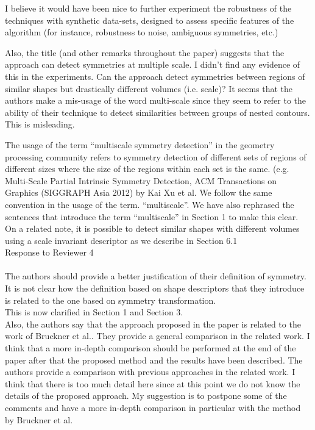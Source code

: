 \documentclass[10pt]{article}
\begin{document}
   I believe it would have been nice to further experiment the robustness of
   the techniques with synthetic data-sets, designed to assess specific
   features of the algorithm (for instance, robustness to noise, ambiguous
   symmetries, etc.)

   Also, the title (and other remarks throughout the paper) suggests that
   the approach can detect symmetries at multiple scale. I didn't find any
   evidence of this in the experiments. Can the approach detect symmetries
   between regions of similar shapes but drastically different volumes (i.e.
   scale)?
   It seems that the authors make a mis-usage of the word multi-scale since
   they seem to refer to the ability of their technique to detect
   similarities between groups of nested contours. This is misleading.

   {\color{blue}The usage of the term ``multiscale symmetry detection'' in
	   the geometry processing community refers to symmetry detection of
	   different sets of regions of different sizes where the size of the regions
	   within each set is the same. (e.g. Multi-Scale Partial Intrinsic Symmetry Detection,
   ACM Transactions on Graphics (SIGGRAPH Asia 2012) by Kai Xu et al.
   We follow the same convention in the usage of the term. ``multiscale''.
   We have also rephrased the sentences that introduce the term ``multiscale''
   in Section 1 to make this clear. On a related note, it is possible to
   detect similar shapes with different volumes using a scale invariant descriptor  as we describe in Section 6.1}\\
   

{\noindent \LARGE Response to Reviewer 4}\\\\
   The authors should provide a better justification of their definition of
   symmetry. It is not clear how the definition based on shape descriptors
   that they introduce is related to the one based on symmetry
   transformation. \\

   {\color{blue}This is now clarified in Section 1 and Section 3.}\\

   Also, the authors say that the approach proposed in the paper is related
   to the work of Bruckner et al.. They provide a general comparison in the
   related work. I think that a more in-depth comparison should be performed
   at the end of the paper after that the proposed method and the results
   have been described.
   The authors provide a comparison with previous approaches in the related
   work. I think that there is too much detail here since at this point we
   do not know the details of the proposed approach. My suggestion is to
   postpone some of the comments and have a more in-depth comparison in
   particular with the method by Bruckner et al.
\end{document}
